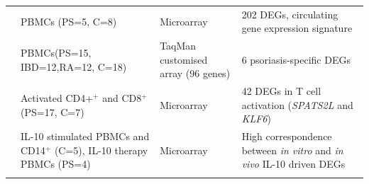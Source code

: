 \begin{landscape}
\begin{center}
\begin{longtable}[htp]{p{.25\textheight} p{.40\textheight} p{.25\textheight} p{.60\textheight}}
\parencite{Lee2009}	   & PBMCs (PS=5, C=8)	      & Microarray             & 202 DEGs, circulating gene expression signature \\
\parencite{Mesko2010}  & PBMCs(PS=15, IBD=12,RA=12, C=18)      &  TaqMan customised array (96 genes)     & 6 psoriasis-specific DEGs \\
\parencite{Palau2013}	 & Activated CD4+$^+$ and CD8$^+$  (PS=17, C=7) & Microarray  & 42 DEGs in T cell activation (\textit{SPATS2L} and \textit{KLF6})\\
\parencite{Jung2004}  & IL-10 stimulated PBMCs and CD14$^+$ (C=5), IL-10 therapy PBMCs (PS=4) & Microarray  & High correspondence between \textit{in vitro} and \textit{in vivo} IL-10 driven DEGs \\
\bottomrule
\medskip
\end{longtable}
\end{center}
\end{landscape}

